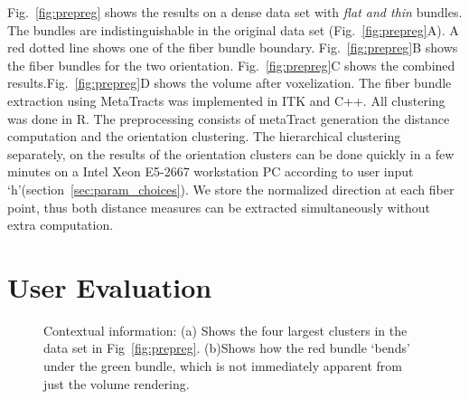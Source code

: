 Fig.~\ref{fig:prepreg} shows the results on a dense data set with \textit{flat and thin} bundles. The bundles are indistinguishable in the original data set (Fig.~\ref{fig:prepreg}A). A red dotted line shows one of the fiber bundle boundary. Fig.~\ref{fig:prepreg}B shows the fiber bundles for the two orientation. Fig.~\ref{fig:prepreg}C shows the combined results.Fig.~\ref{fig:prepreg}D shows the volume after voxelization.
The fiber bundle extraction using MetaTracts was implemented in ITK and C++. All clustering was done in R. The preprocessing consists of metaTract generation the distance computation and the orientation clustering. The hierarchical clustering separately, on the results of the orientation clusters can be done  quickly in a few minutes on a Intel Xeon E5-2667 workstation PC according to user input `h'(section~\ref{sec:param_choices}). We store the normalized direction at each fiber point, thus both distance measures can be extracted simultaneously without extra computation.

\section {User Evaluation}
\label {sec:evaluation}
\begin{figure}[h]
\centering
{}
\caption{Contextual information: (a) Shows the four largest clusters in the data set in Fig~\ref{fig:prepreg}.
(b)Shows how the red bundle `bends' under the green bundle, which is not immediately apparent from just the volume rendering.}
\label{fig:context}
\end{figure}
